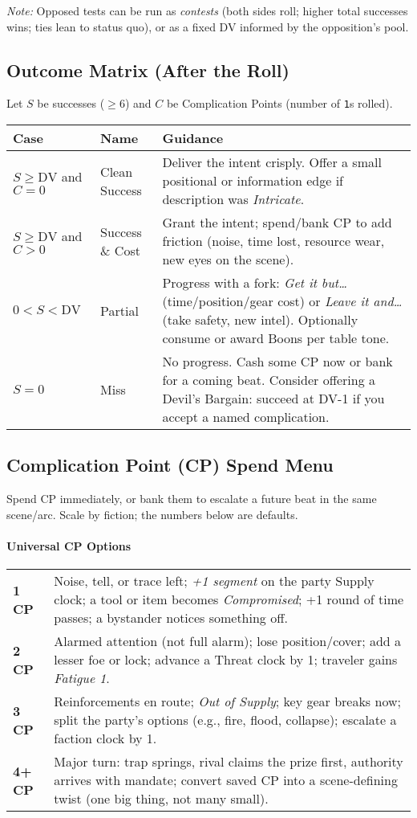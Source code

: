 \documentclass[12pt]{book}
\begin{document}
\smallskip
\noindent\emph{Note:} Opposed tests can be run as \emph{contests} (both sides roll; higher total successes wins; ties lean to status quo), or as a fixed DV informed by the opposition's pool.

\subsection{Outcome Matrix (After the Roll)}
Let $S$ be successes ($\ge 6$) and $C$ be Complication Points (number of \texttt{1}s rolled).

\begin{tabular}{@{}llp{9cm}@{}}
\toprule
\textbf{Case} & \textbf{Name} & \textbf{Guidance} \\
\midrule
$S \ge \mathrm{DV}$ and $C=0$ & Clean Success & Deliver the intent crisply. Offer a small positional or information edge if description was \emph{Intricate}. \\
$S \ge \mathrm{DV}$ and $C>0$ & Success \& Cost & Grant the intent; spend/bank CP to add friction (noise, time lost, resource wear, new eyes on the scene). \\
$0<S<\mathrm{DV}$ & Partial & Progress with a fork: \emph{Get it but…} (time/position/gear cost) or \emph{Leave it and…} (take safety, new intel). Optionally consume or award Boons per table tone. \\
$S=0$ & Miss & No progress. Cash some CP now or bank for a coming beat. Consider offering a Devil’s Bargain: succeed at DV-1 if you accept a named complication. \\
\bottomrule
\end{tabular}

\subsection{Complication Point (CP) Spend Menu}
\noindent Spend CP immediately, or bank them to escalate a future beat in the same scene/arc. Scale by fiction; the numbers below are defaults.

\paragraph{Universal CP Options}
\begin{tabular}{@{}lp{11cm}@{}}
\toprule
\textbf{1 CP} & Noise, tell, or trace left; \emph{+1 segment} on the party Supply clock; a tool or item becomes \emph{Compromised}; +1 round of time passes; a bystander notices something off. \\
\textbf{2 CP} & Alarmed attention (not full alarm); lose position/cover; add a lesser foe or lock; advance a Threat clock by 1; traveler gains \emph{Fatigue 1}. \\
\textbf{3 CP} & Reinforcements en route; \emph{Out of Supply}; key gear breaks now; split the party’s options (e.g., fire, flood, collapse); escalate a faction clock by 1. \\
\textbf{4+ CP} & Major turn: trap springs, rival claims the prize first, authority arrives with mandate; convert saved CP into a scene-defining twist (one big thing, not many small). \\
\bottomrule
\end{tabular}
\end{document}
